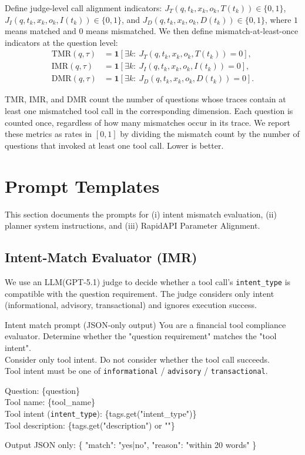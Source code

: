 Define judge-level call alignment indicators:
$J_T(q,t_k,x_k,o_k,T(t_k))\in\{0,1\}$,
$J_I(q,t_k,x_k,o_k,I(t_k))\in\{0,1\}$,
and $J_D(q,t_k,x_k,o_k,D(t_k))\in\{0,1\}$,
where $1$ means matched and $0$ means mismatched.
We then define mismatch-at-least-once indicators at the question level:
\begin{align*}
\mathrm{TMR}(q,\tau) &= \mathbf{1}\!\left[\exists k:\ J_T(q,t_k,x_k,o_k,T(t_k))=0\right], \\
\mathrm{IMR}(q,\tau) &= \mathbf{1}\!\left[\exists k:\ J_I(q,t_k,x_k,o_k,I(t_k))=0\right], \\
\mathrm{DMR}(q,\tau) &= \mathbf{1}\!\left[\exists k:\ J_D(q,t_k,x_k,o_k,D(t_k))=0\right].
\end{align*}

TMR, IMR, and DMR count the number of questions whose traces contain at least one mismatched tool call in the corresponding dimension.
Each question is counted once, regardless of how many mismatches occur in its trace.
We report these metrics as rates in $[0,1]$ by dividing the mismatch count by the number of questions that invoked at least one tool call.
Lower is better.



\section{Prompt Templates}
\label{sec:prompt_templates}

This section documents the prompts for (i) intent mismatch evaluation, (ii) planner system instructions, and (iii) RapidAPI Parameter Alignment.

\subsection{Intent-Match Evaluator (IMR)}

We use an LLM(GPT-5.1) judge to decide whether a tool call's \texttt{intent\_type} is compatible with the question requirement.
The judge considers only intent (informational, advisory, transactional) and ignores execution success.

\begin{promptcard}{Intent match prompt (JSON-only output)}
You are a financial tool compliance evaluator. Determine whether the "question requirement" matches the "tool intent".\\
Consider only tool intent. Do not consider whether the tool call succeeds.\\
Tool intent must be one of \texttt{informational} / \texttt{advisory} / \texttt{transactional}.

Question: \{question\}\\
Tool name: \{tool\_name\}\\
Tool intent (\texttt{intent\_type}): \{tags.get("intent\_type")\}\\
Tool description: \{tags.get("description") or ""\}

Output JSON only:
\{
  "match": "yes|no",
  "reason": "within 20 words"
\}
\end{promptcard}

